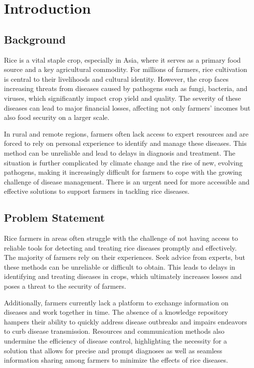 \chapter{Introduction}
\label{chap:introduction}

\section{Background}
\label{section:background}

Rice is a vital staple crop, especially in Asia, where it serves as a primary food source and a key agricultural commodity. For millions of farmers, rice cultivation is central to their livelihoods and cultural identity. However, the crop faces increasing threats from diseases caused by pathogens such as fungi, bacteria, and viruses, which significantly impact crop yield and quality. The severity of these diseases can lead to major financial losses, affecting not only farmers’ incomes but also food security on a larger scale.

In rural and remote regions, farmers often lack access to expert resources and are forced to rely on personal experience to identify and manage these diseases. This method can be unreliable and lead to delays in diagnosis and treatment. The situation is further complicated by climate change and the rise of new, evolving pathogens, making it increasingly difficult for farmers to cope with the growing challenge of disease management. There is an urgent need for more accessible and effective solutions to support farmers in tackling rice diseases.

\section{Problem Statement}
\label{section:problem-statement}

Rice farmers in areas often struggle with the challenge of not having access to reliable tools for detecting and treating rice diseases promptly and effectively. The majority of farmers rely on their experiences. Seek advice from experts, but these methods can be unreliable or difficult to obtain. This leads to delays in identifying and treating diseases in crops, which ultimately increases losses and poses a threat to the security of farmers.

Additionally, farmers currently lack a platform to exchange information on diseases and work together in time. The absence of a knowledge repository hampers their ability to quickly address disease outbreaks and impairs endeavors to curb disease transmission. Resources and communication methods also undermine the efficiency of disease control, highlighting the necessity for a solution that allows for precise and prompt diagnoses as well as seamless information sharing among farmers to minimize the effects of rice diseases.

